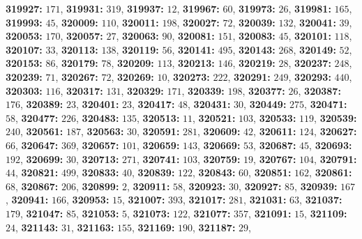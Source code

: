 \textsf{\bfseries 319927:} $171$, \textsf{\bfseries 319931:} $319$, \textsf{\bfseries 319937:} $12$, \textsf{\bfseries 319967:} $60$, \textsf{\bfseries 319973:} $26$, \textsf{\bfseries 319981:} $165$, \textsf{\bfseries 319993:} $45$, \textsf{\bfseries 320009:} $110$, \textsf{\bfseries 320011:} $198$, \textsf{\bfseries 320027:} $72$, \textsf{\bfseries 320039:} $132$, \textsf{\bfseries 320041:} $39$, \textsf{\bfseries 320053:} $170$, \textsf{\bfseries 320057:} $27$, \textsf{\bfseries 320063:} $90$, \textsf{\bfseries 320081:} $151$, \textsf{\bfseries 320083:} $45$, \textsf{\bfseries 320101:} $118$, \textsf{\bfseries 320107:} $33$, \textsf{\bfseries 320113:} $138$, \textsf{\bfseries 320119:} $56$, \textsf{\bfseries 320141:} $495$, \textsf{\bfseries 320143:} $268$, \textsf{\bfseries 320149:} $52$, \textsf{\bfseries 320153:} $86$, \textsf{\bfseries 320179:} $78$, \textsf{\bfseries 320209:} $113$, \textsf{\bfseries 320213:} $146$, \textsf{\bfseries 320219:} $28$, \textsf{\bfseries 320237:} $248$, \textsf{\bfseries 320239:} $71$, \textsf{\bfseries 320267:} $72$, \textsf{\bfseries 320269:} $10$, \textsf{\bfseries 320273:} $222$, \textsf{\bfseries 320291:} $249$, \textsf{\bfseries 320293:} $440$, \textsf{\bfseries 320303:} $116$, \textsf{\bfseries 320317:} $131$, \textsf{\bfseries 320329:} $171$, \textsf{\bfseries 320339:} $198$, \textsf{\bfseries 320377:} $26$, \textsf{\bfseries 320387:} $176$, \textsf{\bfseries 320389:} $23$, \textsf{\bfseries 320401:} $23$, \textsf{\bfseries 320417:} $48$, \textsf{\bfseries 320431:} $30$, \textsf{\bfseries 320449:} $275$, \textsf{\bfseries 320471:} $58$, \textsf{\bfseries 320477:} $226$, \textsf{\bfseries 320483:} $135$, \textsf{\bfseries 320513:} $11$, \textsf{\bfseries 320521:} $103$, \textsf{\bfseries 320533:} $119$, \textsf{\bfseries 320539:} $240$, \textsf{\bfseries 320561:} $187$, \textsf{\bfseries 320563:} $30$, \textsf{\bfseries 320591:} $281$, \textsf{\bfseries 320609:} $42$, \textsf{\bfseries 320611:} $124$, \textsf{\bfseries 320627:} $66$, \textsf{\bfseries 320647:} $369$, \textsf{\bfseries 320657:} $101$, \textsf{\bfseries 320659:} $143$, \textsf{\bfseries 320669:} $53$, \textsf{\bfseries 320687:} $45$, \textsf{\bfseries 320693:} $192$, \textsf{\bfseries 320699:} $30$, \textsf{\bfseries 320713:} $271$, \textsf{\bfseries 320741:} $103$, \textsf{\bfseries 320759:} $19$, \textsf{\bfseries 320767:} $104$, \textsf{\bfseries 320791:} $44$, \textsf{\bfseries 320821:} $499$, \textsf{\bfseries 320833:} $40$, \textsf{\bfseries 320839:} $122$, \textsf{\bfseries 320843:} $60$, \textsf{\bfseries 320851:} $162$, \textsf{\bfseries 320861:} $68$, \textsf{\bfseries 320867:} $206$, \textsf{\bfseries 320899:} $2$, \textsf{\bfseries 320911:} $58$, \textsf{\bfseries 320923:} $30$, \textsf{\bfseries 320927:} $85$, \textsf{\bfseries 320939:} $167$, \textsf{\bfseries 320941:} $166$, \textsf{\bfseries 320953:} $15$, \textsf{\bfseries 321007:} $393$, \textsf{\bfseries 321017:} $281$, \textsf{\bfseries 321031:} $63$, \textsf{\bfseries 321037:} $179$, \textsf{\bfseries 321047:} $85$, \textsf{\bfseries 321053:} $5$, \textsf{\bfseries 321073:} $122$, \textsf{\bfseries 321077:} $357$, \textsf{\bfseries 321091:} $15$, \textsf{\bfseries 321109:} $24$, \textsf{\bfseries 321143:} $31$, \textsf{\bfseries 321163:} $155$, \textsf{\bfseries 321169:} $190$, \textsf{\bfseries 321187:} $29$, 
